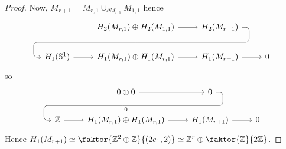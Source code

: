 \begin{proof}
	Now, \( M_{r+1} = M_{r,1} \cup_{\partial M_{r,1}} M_{1,1} \) hence
	\[\begin{tikzcd}
		& {H_2(M_{r,1}) \oplus H_2(M_{1,1})} \ar[draw=none]{d}[name=X, anchor=center]{} & {H_2(M_{r+1})} \ar[rounded corners,
		to path={ -- ([xshift=2ex]\tikztostart.east)
				  |- (X.center) \tikztonodes
				  -| ([xshift=-2ex]\tikztotarget.west)
				  -- (\tikztotarget)}]{dll} \\
		{H_1(\mathbb S^1)} & {H_1(M_{r,1}) \oplus H_1(M_{r,1})} & {H_1(M_{r+1})} & 0
		\arrow[from=1-2, to=1-3]
		\arrow[from=2-1, to=2-2]
		\arrow[from=2-2, to=2-3]
		\arrow[from=2-3, to=2-4]
	\end{tikzcd}\]
	so
	\[\begin{tikzcd}
		& {0 \oplus 0} \ar[draw=none]{d}[name=X, anchor=center]{} & 0 \ar[rounded corners,
		to path={ -- ([xshift=2ex]\tikztostart.east)
				  |- (X.center) \tikztonodes
				  -| ([xshift=-2ex]\tikztotarget.west)
				  -- (\tikztotarget)}]{dll}[at end]{0} \\
		{\mathbb Z} & {H_1(M_{r,1}) \oplus H_1(M_{r,1})} & {H_1(M_{r+1})} & 0
		\arrow[from=1-2, to=1-3]
		\arrow[from=2-1, to=2-2]
		\arrow[from=2-2, to=2-3]
		\arrow[from=2-3, to=2-4]
	\end{tikzcd}\]
	Hence \( H_1(M_{r+1}) \simeq \faktor{\mathbb Z^2 \oplus \mathbb Z}{(2e_1,2)} \simeq \mathbb Z^r \oplus \faktor{\mathbb Z}{2\mathbb Z} \).
\end{proof}

